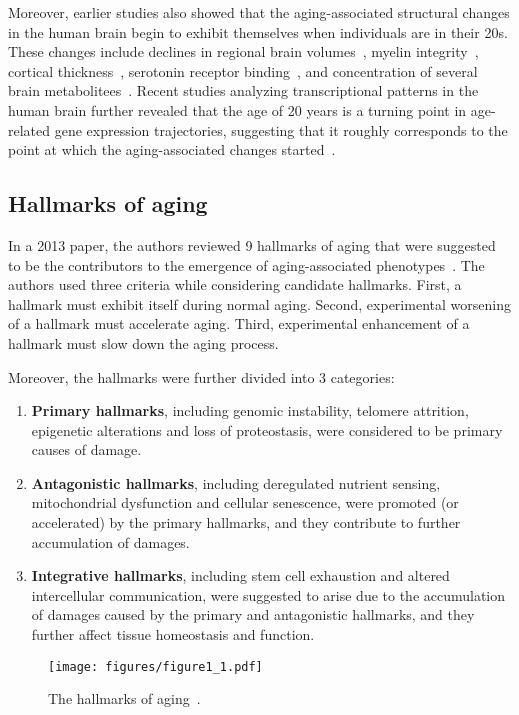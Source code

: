 Moreover, earlier studies also showed that the aging-associated structural changes in the human brain begin to exhibit themselves when individuals are in their 20s.
These changes include declines in regional brain volumes~\autocite{Sowell2003}, myelin integrity~\autocite{Sullivan2006}, cortical thickness~\autocite{Salat2004, Magnotta1999},
serotonin receptor binding~\autocite{Sheline2002}, and concentration of several brain metabolitees~\autocite{Salthouse2009, Kadota2001}.
Recent studies analyzing transcriptional patterns in the human brain further revealed that the age of 20 years is a turning point in age-related gene expression trajectories,
suggesting that it roughly corresponds to the point at which the aging-associated changes started~\autocite{Somel2010, Colantuoni2011, Donertas2017}.

\subsection{Hallmarks of aging}
In a 2013 paper, the authors reviewed 9 hallmarks of aging that were suggested to be the contributors to the emergence of aging-associated phenotypes~\autocite{Lopez2013}.
The authors used three criteria while considering candidate hallmarks. 
First, a hallmark must exhibit itself during normal aging.
Second, experimental worsening of a hallmark must accelerate aging.
Third, experimental enhancement of a hallmark must slow down the aging process. 

Moreover, the hallmarks were further divided into 3 categories:
\begin{enumerate}
    \item \textbf{Primary hallmarks}, including genomic instability, telomere attrition, epigenetic alterations and loss of proteostasis,
    were considered to be primary causes of damage.
    \item \textbf{Antagonistic hallmarks}, including deregulated nutrient sensing, mitochondrial dysfunction and cellular senescence,
    were promoted (or accelerated) by the primary hallmarks, and they contribute to further accumulation of damages.
    \item \textbf{Integrative hallmarks}, including stem cell exhaustion and altered intercellular communication, 
    were suggested to arise due to the accumulation of damages caused by the primary and antagonistic hallmarks,
    and they further affect tissue homeostasis and function.
\end{enumerate}

\begin{figure}[h]
    \centering
    \texttt{[image: figures/figure1\_1.pdf]}
    \caption{The hallmarks of aging~\autocite{Lopez2013}.}
    \label{fig:fig1.1}
\end{figure}

